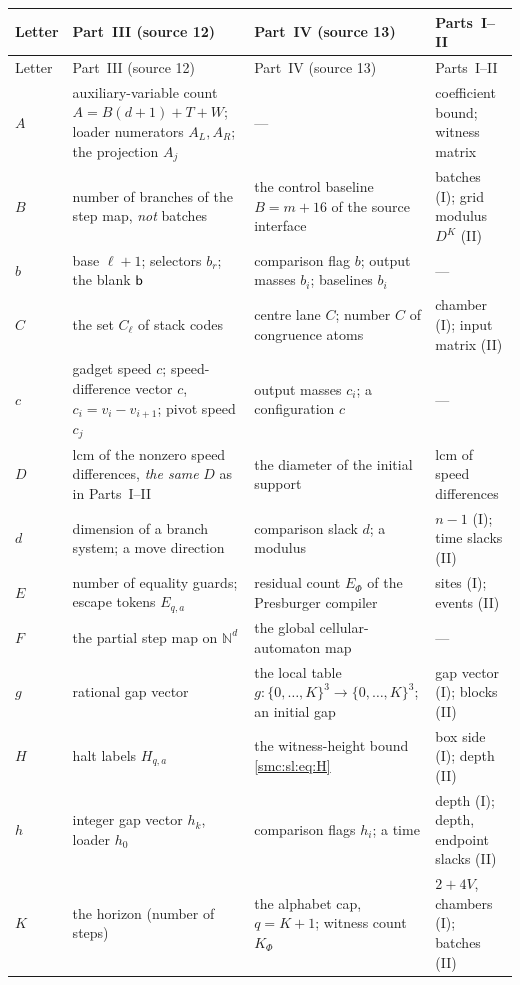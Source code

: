 \documentclass[11pt,letterpaper]{article}
\numberwithin{equation}{section}
\theoremstyle{definition}
\theoremstyle{remark}
\newcommand{\NN}{\mathbb N}
\begin{document}
\begin{center}
\small
\renewcommand{\theHtable}{smc.cs.notation.\arabic{table}}%
\begin{longtable}{@{}L{0.06\textwidth}L{0.33\textwidth}L{0.31\textwidth}L{0.22\textwidth}@{}}
\toprule
Letter & Part~III (source 12) & Part~IV (source 13) & Parts~I--II\\
\midrule
\endfirsthead
\toprule
Letter & Part~III (source 12) & Part~IV (source 13) & Parts~I--II\\
\midrule
\endhead
$A$ & auxiliary-variable count $A=B(d+1)+T+W$; loader numerators $A_L,A_R$; the projection $A_j$ & --- & coefficient bound; witness matrix\\
$B$ & number of branches of the step map, \emph{not} batches & the control baseline $B=m+16$ of the source interface & batches (I); grid modulus $D^K$ (II)\\
$b$ & base $\ell+1$; selectors $b_r$; the blank $\mathsf b$ & comparison flag $b$; output masses $b_i$; baselines $b_i$ & ---\\
$C$ & the set $C_\ell$ of stack codes & centre lane $C$; number $C$ of congruence atoms & chamber (I); input matrix (II)\\
$c$ & gadget speed $c$; speed-difference vector $c$, $c_i=v_i-v_{i+1}$; pivot speed $c_j$ & output masses $c_i$; a configuration $c$ & ---\\
$D$ & lcm of the nonzero speed differences, \emph{the same} $D$ as in Parts~I--II & the diameter of the initial support & lcm of speed differences\\
$d$ & dimension of a branch system; a move direction & comparison slack $d$; a modulus & $n-1$ (I); time slacks (II)\\
$E$ & number of equality guards; escape tokens $E_{q,a}$ & residual count $E_\Phi$ of the Presburger compiler & sites (I); events (II)\\
$F$ & the partial step map on $\NN^d$ & the global cellular-automaton map & ---\\
$g$ & rational gap vector & the local table $g:\{0,\ldots,K\}^3\to\{0,\ldots,K\}^3$; an initial gap & gap vector (I); blocks (II)\\
$H$ & halt labels $H_{q,a}$ & the witness-height bound \eqref{smc:sl:eq:H} & box side (I); depth (II)\\
$h$ & integer gap vector $h_k$, loader $h_0$ & comparison flags $h_i$; a time & depth (I); depth, endpoint slacks (II)\\
$K$ & the horizon (number of steps) & the alphabet cap, $q=K+1$; witness count $K_\Phi$ & $2+4V$, chambers (I); batches (II)\\

\end{longtable}
\end{center}
\end{document}
